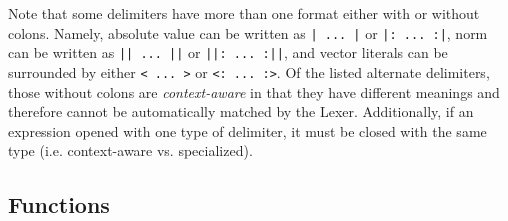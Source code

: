 \documentclass{article}
\begin{document}
  Note that some delimiters have more than one format either with or without colons. Namely, absolute value can be
  written as \texttt{| ... |} or \texttt{|: ... :|}, norm can be written as \texttt{|| ... ||} or \texttt{||: ... :||},
  and vector literals can be surrounded by either \texttt{< ... >} or \texttt{<: ... :>}. Of the listed alternate
  delimiters, those without colons are \emph{context-aware} in that they have different meanings and therefore cannot be automatically
  matched by the Lexer. Additionally, if an expression opened with one type of delimiter, it must be closed with the
  same type (i.e. context-aware vs. specialized).

  \newpage

  \subsection{Functions} %
  \label{sub:functions}
\end{document}
